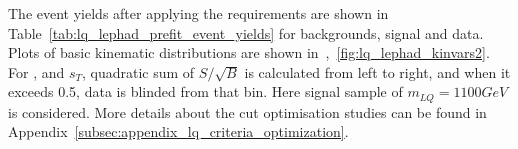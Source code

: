 

The event yields after applying the requirements are shown in Table~\ref{tab:lq_lephad_prefit_event_yields} for backgrounds, signal and data.
Plots of basic kinematic distributions are shown in~,~\ref{fig:lq_lephad_kinvars2}.
For \pT, \MET and $s_T$, quadratic sum of $S/\sqrt{B}$ is calculated from left to right, and when it exceeds 0.5, data is blinded from that bin.
Here signal sample of $m_{LQ} = 1100 GeV$ is considered.
More details about the cut optimisation studies can be found in Appendix~\ref{subsec:appendix_lq_criteria_optimization}.


